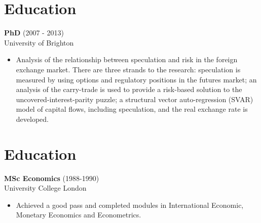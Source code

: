 \documentclass[margin,11pt]{res} %
\begin{document}
\begin{resume}

\section{Education}
 {\bf PhD} (2007 - 2013)\\
   University of Brighton\\
\begin{itemize}
\item Analysis of the relationship between speculation and risk in the foreign exchange market.  There are three strands to the research:  speculation is measured by using options and regulatory positions in the futures market; an analysis of the carry-trade is used to provide a risk-based solution to the uncovered-interest-parity puzzle; a structural vector auto-regression (SVAR) model of capital flows, including speculation, and the real exchange rate is developed.  
\end{itemize}

\section{Education}
 {\bf MSc Economics} (1988-1990)\\
  University College London\\
\begin{itemize}
\item Achieved a good pass and completed modules in International Economic, Monetary Economics and Econometrics.  
\end{itemize}


\end{resume}
\end{document}
